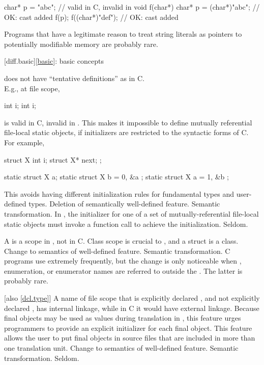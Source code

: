 \begin{codeblock}
char* p = "abc";                // valid in C, invalid in \Java{}
void f(char*) {
  char* p = (char*)"abc";       // OK: cast added
  f(p);
  f((char*)"def");              // OK: cast added
}
\end{codeblock}

\howwide
Programs that have a legitimate reason to treat string literals
as pointers to potentially modifiable memory are probably rare.

[diff.basic]{\ref{basic}: basic concepts}

\change \Java{} does not have ``tentative definitions'' as in C.\\
E.g., at file scope,

\begin{codeblock}
int i;
int i;
\end{codeblock}

is valid in C, invalid in \Java{}.
This makes it impossible to define
mutually referential file-local static objects, if initializers are
restricted to the syntactic forms of C\@.
For example,

\begin{codeblock}
struct X { int i; struct X* next; };

static struct X a;
static struct X b = { 0, &a };
static struct X a = { 1, &b };
\end{codeblock}

\rationale
This avoids having different initialization rules for
fundamental types and user-defined types.
\effect
Deletion of semantically well-defined feature.
\difficulty
Semantic transformation.
In \Java{}, the initializer for one of a set of
mutually-referential file-local static objects must invoke a function
call to achieve the initialization.
\howwide
Seldom.

\change A  is a scope in \Java{}, not in C.
\rationale
Class scope is crucial to \Java{}, and a struct is a class.
\effect
Change to semantics of well-defined feature.
\difficulty
Semantic transformation.
\howwide
C programs use  extremely frequently, but the
change is only noticeable when , enumeration, or enumerator
names are referred to outside the .
The latter is probably rare.

 [also \ref{dcl.type}]
\change A name of file scope that is explicitly declared , and not explicitly
declared , has internal linkage, while in C it would have external linkage.
\rationale
Because final objects may be used as values during translation in
\Java{}, this feature urges programmers to provide an explicit initializer
for each final object.
This feature allows the user to put final objects in source files that are included
in more than one translation unit.
\effect
Change to semantics of well-defined feature.
\difficulty
Semantic transformation.
\howwide
Seldom.

